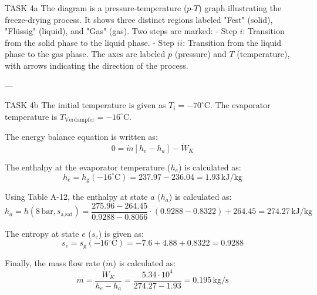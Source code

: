 TASK 4a  
The diagram is a pressure-temperature (\( p \)-\( T \)) graph illustrating the freeze-drying process. It shows three distinct regions labeled "Fest" (solid), "Flüssig" (liquid), and "Gas" (gas). Two steps are marked:  
- Step \( i \): Transition from the solid phase to the liquid phase.  
- Step \( ii \): Transition from the liquid phase to the gas phase.  
The axes are labeled \( p \) (pressure) and \( T \) (temperature), with arrows indicating the direction of the process.

---

TASK 4b  
The initial temperature is given as \( T_i = -70^\circ\text{C} \).  
The evaporator temperature is \( T_{\text{Verdampfer}} = -16^\circ\text{C} \).

The energy balance equation is written as:  
\[
0 = \dot{m} \left[ h_e - h_a \right] - \dot{W}_K
\]

The enthalpy at the evaporator temperature (\( h_e \)) is calculated as:  
\[
h_e = h_{\text{g}}(-16^\circ\text{C}) = 237.97 - 236.04 = 1.93 \, \text{kJ/kg}
\]

Using Table A-12, the enthalpy at state \( a \) (\( h_a \)) is calculated as:  
\[
h_a = h(8 \, \text{bar}, s_{\text{a,sat}}) = \frac{275.96 - 264.45}{0.9288 - 0.8066} \cdot (0.9288 - 0.8322) + 264.45 = 274.27 \, \text{kJ/kg}
\]

The entropy at state \( e \) (\( s_e \)) is given as:  
\[
s_e = s_{\text{g}}(-16^\circ\text{C}) = -7.6 + 4.88 + 0.8322 = 0.9288
\]

Finally, the mass flow rate (\( \dot{m} \)) is calculated as:  
\[
\dot{m} = \frac{\dot{W}_K}{h_e - h_a} = \frac{5.34 \cdot 10^4}{274.27 - 1.93} = 0.195 \, \text{kg/s}
\]